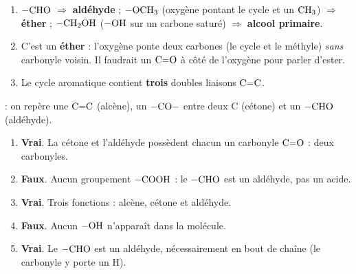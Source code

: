 \documentclass[11pt,a4paper]{article}
\begin{document}
\begin{corrige}
\begin{enumerate}[label=\alph*)]
  \item $-\ce{CHO}$ $\Rightarrow$ \textbf{aldéhyde} ; $-\ce{OCH3}$ (oxygène pontant le cycle et un $\ce{CH3}$) $\Rightarrow$ \textbf{éther} ; $-\ce{CH2OH}$ ($-\ce{OH}$ sur un carbone saturé) $\Rightarrow$ \textbf{alcool primaire}.
  \item C'est un \textbf{éther} : l'oxygène ponte deux carbones (le cycle et le méthyle) \emph{sans} carbonyle voisin. Il faudrait un $\ce{C=O}$ à côté de l'oxygène pour parler d'ester.
  \item Le cycle aromatique contient \textbf{trois} doubles liaisons $\ce{C=C}$.
\end{enumerate}
\end{corrige}

\begin{corrige}
 : on repère une $\ce{C=C}$ (alcène), un $\ce{-CO-}$ entre deux C (cétone) et un $\ce{-CHO}$ (aldéhyde).
\begin{enumerate}[label=\alph*)]
  \item \textbf{Vrai}. La cétone et l'aldéhyde possèdent chacun un carbonyle $\ce{C=O}$ : deux carbonyles.
  \item \textbf{Faux}. Aucun groupement $-\ce{COOH}$ : le $\ce{-CHO}$ est un aldéhyde, pas un acide.
  \item \textbf{Vrai}. Trois fonctions : alcène, cétone et aldéhyde.
  \item \textbf{Faux}. Aucun $-\ce{OH}$ n'apparaît dans la molécule.
  \item \textbf{Vrai}. Le $-\ce{CHO}$ est un aldéhyde, nécessairement en bout de chaîne (le carbonyle y porte un H).
\end{enumerate}
\end{corrige}
\end{document}
